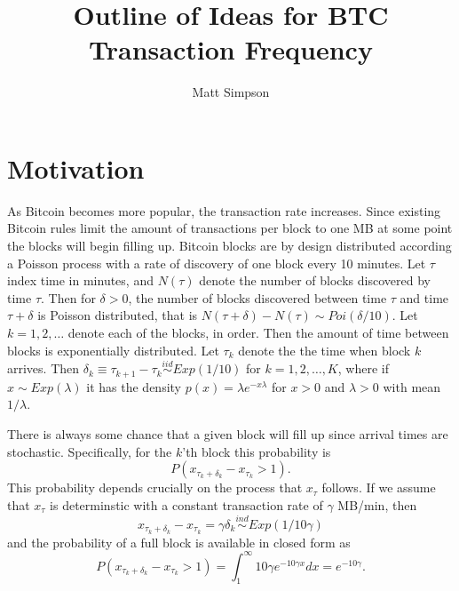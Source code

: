 \documentclass{article}
\author{Matt Simpson}
\title{Outline of Ideas for BTC Transaction Frequency}
\begin{document}
\maketitle




\section{Motivation}
As Bitcoin becomes more popular, the transaction rate increases. Since existing Bitcoin rules limit the amount of transactions per block to one MB at some point the blocks will begin filling up. Bitcoin blocks are by design distributed according a Poisson process with a rate of discovery of one block every 10 minutes. Let $\tau$ index time in minutes, and $N(\tau)$ denote the number of blocks discovered by time $\tau$. Then for $\delta > 0$, the number of blocks discovered between time $\tau$ and time $\tau + \delta$ is Poisson distributed, that is $N(\tau + \delta) - N(\tau) \sim Poi(\delta/10)$. Let $k=1,2,\dots$ denote each of the blocks, in order. Then the amount of time between blocks is exponentially distributed. Let $\tau_k$ denote the the time when block $k$ arrives. Then $\delta_k \equiv \tau_{k+1} - \tau_{k} \stackrel{iid}{\sim} Exp(1/10)$ for $k=1,2,\dots,K$, where if $x\sim Exp(\lambda)$ it has the density $p(x) = \lambda e^{-x\lambda}$ for $x>0$ and $\lambda>0$ with mean $1/\lambda$. 

There is always some chance that a given block will fill up since arrival times are stochastic. Specifically, for the $k$'th block this probability is
\[
P\left(x_{\tau_k + \delta_k} - x_{\tau_k} > 1\right).
\]
This probability depends crucially on the process that $x_\tau$ follows. If we assume that $x_{\tau}$ is determinstic with a constant transaction rate of $\gamma$ MB/min, then 
\[
x_{\tau_k + \delta_k} - x_{\tau_k} = \gamma\delta_k \stackrel{ind}{\sim} Exp(1/10\gamma)
\]
and the probability of a full block is available in closed form as
\[
P\left(x_{\tau_k + \delta_k} - x_{\tau_k} > 1\right) = \int_1^\infty 10\gamma e^{-10\gamma x}dx = e^{-10\gamma}.
\]
\end{document}
